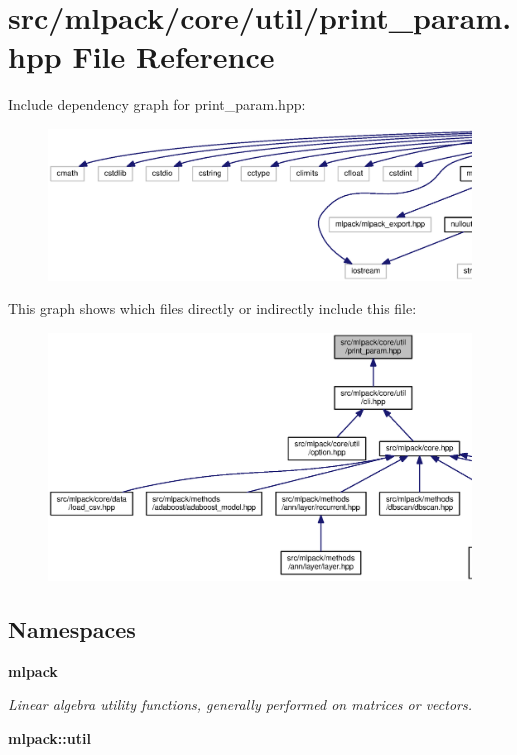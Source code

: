 \section{src/mlpack/core/util/print\+\_\+param.hpp File Reference}
\label{print__param_8hpp}
Include dependency graph for print\+\_\+param.\+hpp\+:
\nopagebreak
\begin{figure}[H]
\begin{center}
\leavevmode
\includegraphics[width=350pt]{print__param_8hpp__incl}
\end{center}
\end{figure}
This graph shows which files directly or indirectly include this file\+:
\nopagebreak
\begin{figure}[H]
\begin{center}
\leavevmode
\includegraphics[width=350pt]{print__param_8hpp__dep__incl}
\end{center}
\end{figure}
\subsection*{Namespaces}
\begin{DoxyCompactItemize}
\item 
 {\bf mlpack}
\begin{DoxyCompactList}\small\item\em Linear algebra utility functions, generally performed on matrices or vectors. \end{DoxyCompactList}\item 
 {\bf mlpack\+::util}
\end{DoxyCompactItemize}
